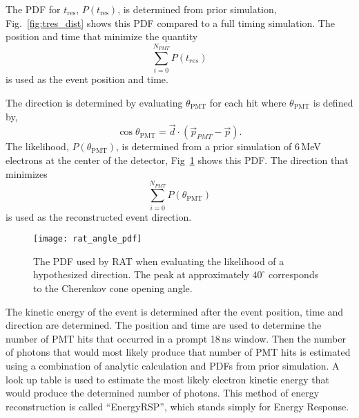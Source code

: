 The PDF for $t_{\mathrm{res}}$, $P(t_{\mathrm{res}})$, is determined from prior simulation,
Fig.~\ref{fig:tres_dist} shows this PDF compared to a full timing simulation.
The position and time that minimize the quantity
\begin{equation}
\sum_{i=0}^{N_{PMT}} P(t_{res}) %
\end{equation}
is used as the event position and time.

The direction is determined by evaluating $\theta_{\mathrm{PMT}}$ for each hit where
$\theta_{\mathrm{PMT}}$ is defined by,
\begin{equation}
    \cos\theta_{\mathrm{PMT}} = \vec{d}\cdot\left(\vec{p}_{PMT} - \vec{p}\right)\text{.}
\end{equation}
The likelihood, $P(\theta_{\mathrm{PMT}})$, is determined from a prior simulation of
6\,MeV electrons at the center of the detector, Fig~\ref{fig:rat_angle_pdf} shows
this PDF\@. %
The direction that minimizes
\begin{equation}
\sum_{i=0}^{N_{PMT}} P(\theta_{\mathrm{PMT}})
\end{equation}
is used as the reconstructed event direction.

\begin{figure}[htbp]
\centering
\texttt{[image: rat\_angle\_pdf]}
\caption[RAT PDF for Direction Fit]{The PDF used by RAT when evaluating the
likelihood of a hypothesized direction.  The peak at approximately $40^{\circ}$
corresponds to the Cherenkov cone opening angle.}
\label{fig:rat_angle_pdf}
\end{figure}

The kinetic energy of the event is determined after
the event position, time and direction are determined.
The position and time are used to determine the number of PMT
hits that occurred in a prompt 18\,ns window.
Then the number of photons that would most likely produce
that number of PMT hits is estimated using a combination of
analytic calculation and PDFs from prior simulation.
A look up table is used to estimate the most likely electron
kinetic energy that would produce the determined number of photons.
This method of energy reconstruction is called ``EnergyRSP'', which stands
simply for Energy Response.

